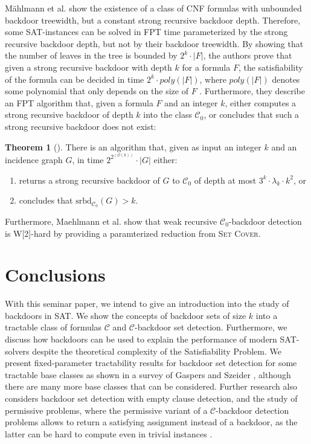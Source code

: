 \documentclass[11pt,a4paper]{article}
\theoremstyle{definition}
\theoremstyle{proposition}
\newtheorem{theorem}{Theorem}[section]
\begin{document}
Mählmann et al. show the existence of a class of CNF formulas with unbounded backdoor treewidth, but a constant strong recursive backdoor depth. Therefore, some SAT-instances can be solved in FPT time parameterized by the strong recursive backdoor depth, but not by their backdoor treewidth. By showing that the number of leaves in the tree is bounded by $2^k \cdot |F|$, the authors prove that given a strong recursive backdoor with depth $k$ for a formula $F$, the satisfiability of the formula can be decided in time $2^k \cdot poly(|F|)$, where $poly(|F|)$ denotes some polynomial that only depends on the size of $F$ \cite[p.6]{maehlmann2021recursive}. Furthermore, they describe an FPT algorithm that, given a formula $F$ and an integer $k$, either computes a strong recursive backdoor of depth $k$ into the class $\mathcal{C}_0$, or concludes that such a strong recursive backdoor does not exist: 
\begin{theorem}[{\cite[Theorem 4.5, p.10]{maehlmann2021recursive}}]
There is an algorithm that, given as input an integer $k$ and an incidence graph $G$, in time $2^{2^(\mathcal{O}(k))} \cdot |G|$ either: 
\begin{enumerate}
\item returns a strong recursive backdoor of $G$ to $\mathcal{C}_{0}$ of depth at most $3^k \cdot \lambda_k \cdot k^2$, or
\item concludes that $\text{srbd}_{\mathcal{C}_0}(G) > k$.
\end{enumerate}
\end{theorem}
Furthermore, Maehlmann et al. show that weak recursive $\mathcal{C}_0$-backdoor detection is W[2]-hard by providing a paramterized reduction from \textsc{Set Cover}\cite[p.12]{maehlmann2021recursive}.  

\section{Conclusions}
\label{sec:conclusions}
With this seminar paper, we intend to give an introduction into the study of backdoors in SAT. We show the concepts of backdoor sets of size $k$ into a tractable class of formulas $\mathcal{C}$ and $\mathcal{C}$-backdoor set detection. Furthermore, we discuss how backdoors can be used to explain the performance of modern SAT-solvers despite the theoretical complexity of the Satisfiability Problem. We present fixed-parameter tractability results for backdoor set detection for some tractable base classes as shown in a survey of Gaspers and Szeider \cite{Gaspers2012}, although there are many more base classes that can be considered. Further research also considers backdoor set detection with empty clause detection, and the study of permissive problems, where the permissive variant of a $\mathcal{C}$-backdoor detection problems allows to return a satisfying assignment instead of a backdoor, as the latter can be hard to compute even in trivial instances \cite[p.301]{Gaspers2012}. 
\end{document}

